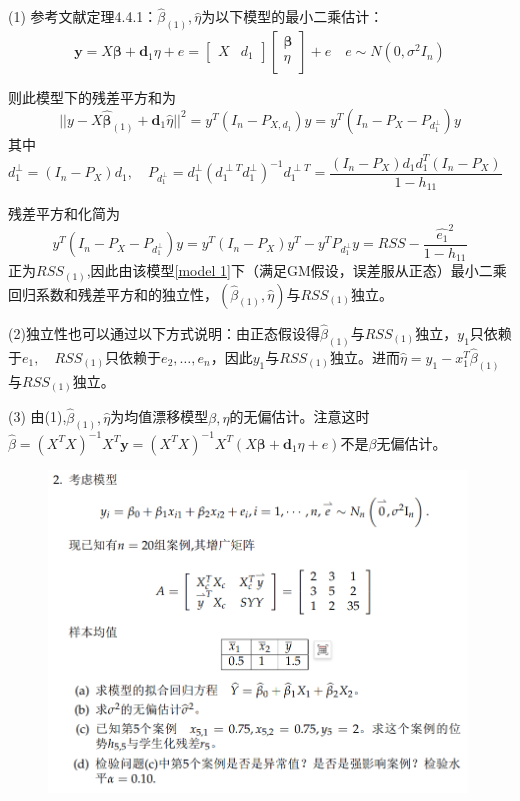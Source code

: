 \documentclass[cn,hazy,green,12pt,normal]{elegantnote}
\numberwithin{equation}{section}
\numberwithin{subsection}{section}
\begin{document}
\begin{note}
   (1) 参考文献定理4.4.1\cite{王松桂1999线性统计模型}：$\hat{\beta}_{(1)},\hat{\eta}$为以下模型的最小二乘估计：
    \begin{equation}\label{model 1}
            \bm y = X\bm \beta + \bm d_1 \eta + e=\begin{bmatrix}
        X&d_1
    \end{bmatrix}\begin{bmatrix}
        \bm \beta \\
        \eta\\
    \end{bmatrix}+e \quad e\sim N(0,\sigma^2I_n) 
    \end{equation}


    则此模型下的残差平方和为
    \[||y-X\hat{\bm \beta}_{(1)} + \bm d_1 \hat{\eta}||^2=y^T(I_n-P_{X,d_1})y=y^T(I_n-P_{X}-P_{d_1^{\perp}})y\]
    其中$d_1^{\perp} = (I_n-P_X)d_1,\quad P_{d_1^{\perp}}=d_1^{\perp}(d_1^{\perp T}d_1^{\perp})^{-1}d_1^{\perp T}=\dfrac{(I_n-P_X)d_1d_1^T(I_n-P_X)}{1-h_{11}}$
    
    残差平方和化简为
    \[y^T(I_n-P_{X}-P_{d_1^{\perp}})y=y^T(I_n-P_{X})y^T-y^TP_{d_1^{\perp}}y=RSS-\dfrac{\hat{e_1}^2}{1-h_{11}}\]
    正为$RSS_{(1)}$,因此由该模型\eqref{model 1}下（满足GM假设，误差服从正态）最小二乘回归系数和残差平方和的独立性，$(\hat{\beta}_{(1)},\hat{\eta})$与$RSS_{(1)}$独立。

    (2)独立性也可以通过以下方式说明：由正态假设得$\hat{\beta}_{(1)}$与$RSS_{(1)}$独立，$y_1$只依赖于$e_1,\quad RSS_{(1)}$只依赖于$e_2,\dots,e_n$，因此$y_1$与$RSS_{(1)}$独立。进而$\hat{\eta}=y_1-x_1^T\hat{\beta}_{(1)}$与$RSS_{(1)}$独立。

    (3) 由(1),$\hat{\beta}_{(1)},\hat{\eta}$为均值漂移模型$\beta,\eta$的无偏估计。注意这时$\hat{\beta}=(X^TX)^{-1}X^T\bm y = (X^TX)^{-1}X^T(X\bm \beta + \bm d_1 \eta + e)$不是$\beta$无偏估计。

\end{note}
\newpage

\begin{homework}
\end{homework}
    \begin{figure}[!htbp]
        \centering
        \includegraphics[width=30em]{image/hw3_plt2.png}
    \end{figure}
\end{document}
